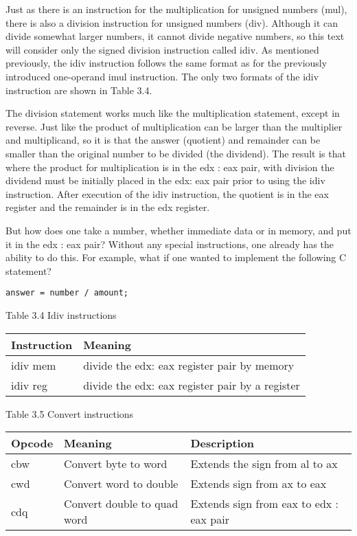 \documentclass[10pt]{article}
\begin{document}
Just as there is an instruction for the multiplication for unsigned numbers (mul), there is also a division instruction for unsigned numbers (div). Although it can divide somewhat larger numbers, it cannot divide negative numbers, so this text will consider only the signed division instruction called idiv. As mentioned previously, the idiv instruction follows the same format as for the previously introduced one-operand imul instruction. The only two formats of the idiv instruction are shown in Table 3.4.

The division statement works much like the multiplication statement, except in reverse. Just like the product of multiplication can be larger than the multiplier and multiplicand, so it is that the answer (quotient) and remainder can be smaller than the original number to be divided (the dividend). The result is that where the product for multiplication is in the edx : eax pair, with division the dividend must be initially placed in the edx: eax pair prior to using the idiv instruction. After execution of the idiv instruction, the quotient is in the eax register and the remainder is in the edx register.

But how does one take a number, whether immediate data or in memory, and put it in the edx : eax pair? Without any special instructions, one already has the ability to do this. For example, what if one wanted to implement the following C statement?

\begin{verbatim}
answer = number / amount;
\end{verbatim}

Table 3.4 Idiv instructions

\begin{center}
\begin{tabular}{|l|l|}
\hline
Instruction & Meaning \\
\hline
idiv mem & divide the edx: eax register pair by memory \\
\hline
idiv reg & divide the edx: eax register pair by a register \\
\hline
\end{tabular}
\end{center}

Table 3.5 Convert instructions

\begin{center}
\begin{tabular}{|l|l|l|}
\hline
Opcode & Meaning & Description \\
\hline
cbw & Convert byte to word & Extends the sign from al to ax \\
\hline
cwd & Convert word to double & Extends sign from ax to eax \\
\hline
cdq & Convert double to quad word & Extends sign from eax to edx : eax pair \\
\hline
\end{tabular}
\end{center}
\end{document}
